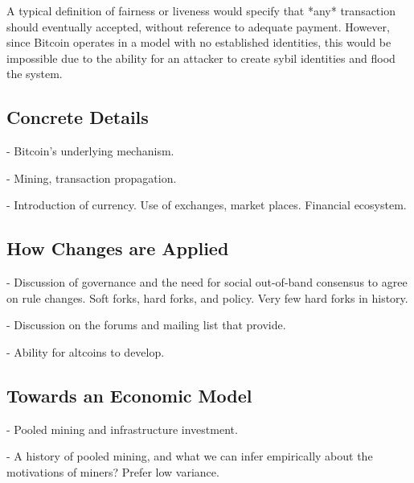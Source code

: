 A typical definition of fairness or liveness would specify that *any* transaction should eventually accepted, without reference to adequate payment. However, since Bitcoin operates in a model with no established identities, this would be impossible due to the ability for an attacker to create sybil identities and flood the system.

\subsection{Concrete Details}
- Bitcoin's underlying mechanism.

- Mining, transaction propagation.

- Introduction of currency. Use of exchanges, market places. Financial ecosystem.

\subsection{How Changes are Applied}

- Discussion of governance and the need for social out-of-band consensus to agree on rule changes. Soft forks, hard forks, and policy. Very few hard forks in history.

- Discussion on the forums and mailing list that provide.

- Ability for altcoins to develop.

\subsection{Towards an Economic Model}

- Pooled mining and infrastructure investment.

- A history of pooled mining, and what we can infer empirically about the motivations of miners? Prefer low variance.

